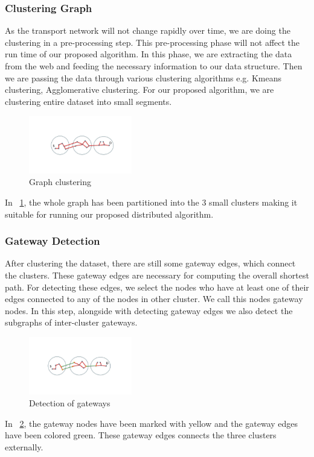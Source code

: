 \subsubsection{Clustering Graph} As the transport network will not change rapidly over time, we are doing the clustering in a pre-processing step. This pre-processing phase will not affect the run time of our proposed algorithm. In this phase, we are extracting the data from the web and feeding the necessary information to our data structure. Then we are passing the data through various clustering algorithms e.g. Kmeans clustering, Agglomerative clustering. For our proposed algorithm, we are clustering entire dataset into small segments.
\begin{figure}[h]
\centering
\includegraphics[width=0.4\textwidth]{images/Clustering_graph.pdf}
\caption{Graph clustering}
\label{fig:graph_clustering}
\end{figure}
In \figurename~\ref{fig:graph_clustering}, the whole graph has been partitioned into the 3 small clusters making it suitable for running our proposed distributed algorithm.
\subsubsection{Gateway Detection} After clustering the dataset, there are still some gateway edges, which connect the clusters. These gateway edges are necessary for computing the overall shortest path. For detecting these edges, we select the nodes who have at least one of their edges connected to any of  the nodes in other cluster. We call this nodes gateway nodes. In this step, alongside with detecting gateway edges we also detect the subgraphs of inter-cluster gateways.

\begin{figure}[!htb]
\centering
\includegraphics[width=0.4\textwidth]{images/Gateway_detection.pdf}
\caption{Detection of gateways}
\label{fig:gateway_detection}
\end{figure}
In \figurename~\ref{fig:gateway_detection}, the gateway nodes have been marked with yellow and the gateway edges have been colored green. These gateway edges connects the three clusters externally.

